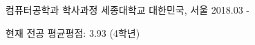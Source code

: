 

\begin{cventries}

  \cventry
    {컴퓨터공학과 학사과정} %
    {세종대학교} %
    {대한민국, 서울} %
    {2018.03 - } %
    {
      \begin{cvitems} %
        \item {현재 전공 평균평점: 3.93 (4학년)}
      \end{cvitems}
    }

\end{cventries}
